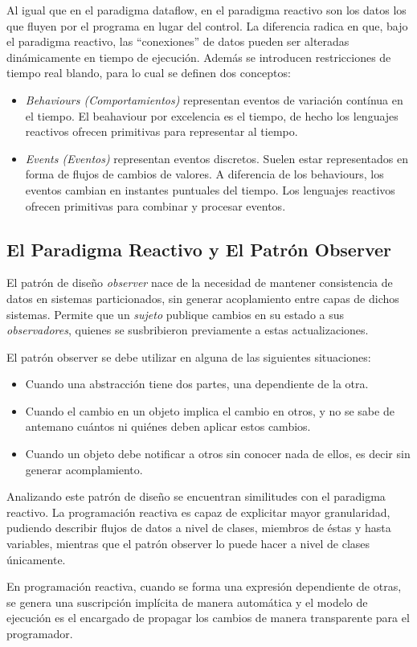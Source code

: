 Al igual que en el paradigma dataflow, en el paradigma reactivo son los datos
los que fluyen por el programa en lugar del control. La diferencia radica en
que, bajo el paradigma reactivo, las ``conexiones'' de datos pueden ser
alteradas dinámicamente en tiempo de ejecución.
Además se introducen restricciones de tiempo real blando, para lo cual se
definen dos conceptos:
\begin{itemize}
  \item \textit{Behaviours (Comportamientos)} representan eventos de variación
  contínua en el tiempo. El beahaviour por excelencia es el tiempo, de hecho los
  lenguajes reactivos ofrecen primitivas para representar al tiempo.
  \item \textit{Events (Eventos)} representan eventos discretos. Suelen estar
  representados en forma de flujos de cambios de valores. A diferencia de los
  behaviours, los eventos cambian en instantes puntuales del tiempo. Los
  lenguajes reactivos ofrecen primitivas para combinar y procesar eventos.
\end{itemize}
\cite{Bainomugisha:2013:SRP:2501654.2501666}

\subsection*{El Paradigma Reactivo y El Patrón Observer}

El patrón de diseño \textit{observer} \cite{Gamma:1995:DPE:186897} nace de la
necesidad de mantener consistencia de datos en sistemas particionados, sin generar
acoplamiento entre capas de dichos sistemas.
Permite que un \textit{sujeto} publique cambios en su estado a sus
\textit{observadores}, quienes se susbribieron previamente a estas
actualizaciones.

El patrón observer se debe utilizar en alguna de las siguientes situaciones:
\begin{itemize}
  \item Cuando una abstracción tiene dos partes, una dependiente de la otra.
  \item Cuando el cambio en un objeto implica el cambio en otros, y no se sabe
  de antemano cuántos ni quiénes deben aplicar estos cambios.
  \item Cuando un objeto debe notificar a otros sin conocer nada de ellos, es
  decir sin generar acomplamiento.
\end{itemize}
\cite{Gamma:1995:DPE:186897}

Analizando este patrón de diseño se encuentran similitudes con el paradigma
reactivo.
La programación reactiva es capaz de explicitar mayor granularidad, pudiendo
describir flujos de datos a nivel de clases, miembros de éstas y hasta
variables, mientras que el patrón observer lo puede hacer a nivel de clases
únicamente.

En programación reactiva, cuando se forma una expresión dependiente de otras, se
genera una suscripción implícita de manera automática y el modelo de ejecución
es el encargado de propagar los cambios de manera transparente para el
programador.

